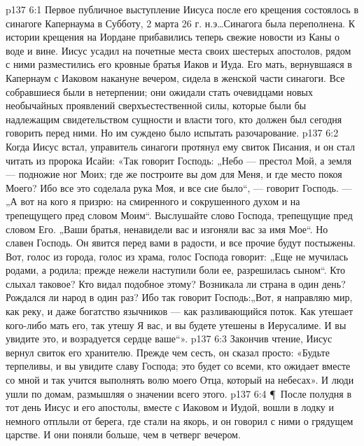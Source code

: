 \vs p137 6:1 Первое публичное выступление Иисуса после его крещения состоялось в синагоге Капернаума в Субботу, 2 марта 26 г. н.э\ldots Синагога была переполнена. К истории крещения на Иордане прибавились теперь свежие новости из Каны о воде и вине. Иисус усадил на почетные места своих шестерых апостолов, рядом с ними разместились его кровные братья Иаков и Иуда. Его мать, вернувшаяся в Капернаум с Иаковом накануне вечером, сидела в женской части синагоги. Все собравшиеся были в нетерпении; они ожидали стать очевидцами новых необычайных проявлений сверхъестественной силы, которые были бы надлежащим свидетельством сущности и власти того, кто должен был сегодня говорить перед ними. Но им суждено было испытать разочарование.
\vs p137 6:2 Когда Иисус встал, управитель синагоги протянул ему свиток Писания, и он стал читать из пророка Исайи: «Так говорит Господь: „Небо --- престол Мой, а земля --- подножие ног Моих; где же построите вы дом для Меня, и где место покоя Моего? Ибо все это соделала рука Моя, и все сие было“, --- говорит Господь. --- „А вот на кого я призрю: на смиренного и сокрушенного духом и на трепещущего пред словом Моим“. Выслушайте слово Господа, трепещущие пред словом Его. „Ваши братья, ненавидели вас и изгоняли вас за имя Мое“. Но славен Господь. Он явится перед вами в радости, и все прочие будут постыжены. Вот, голос из города, голос из храма, голос Господа говорит: „Еще не мучилась родами, а родила; прежде нежели наступили боли ее, разрешилась сыном“. Кто слыхал таковое? Кто видал подобное этому? Возникала ли страна в один день? Рождался ли народ в один раз? Ибо так говорит Господь:„Вот, я направляю мир, как реку, и даже богатство язычников --- как разливающийся поток. Как утешает кого\hyp{}либо мать его, так утешу Я вас, и вы будете утешены в Иерусалиме. И вы увидите это, и возрадуется сердце ваше“».
\vs p137 6:3 Закончив чтение, Иисус вернул свиток его хранителю. Прежде чем сесть, он сказал просто: «Будьте терпеливы, и вы увидите славу Господа; это будет со всеми, кто ожидает вместе со мной и так учится выполнять волю моего Отца, который на небесах». И люди ушли по домам, размышляя о значении всего этого.
\vs p137 6:4 \P\ После полудня в тот день Иисус и его апостолы, вместе с Иаковом и Иудой, вошли в лодку и немного отплыли от берега, где стали на якорь, и он говорил с ними о грядущем царстве. И они поняли больше, чем в четверг вечером.
